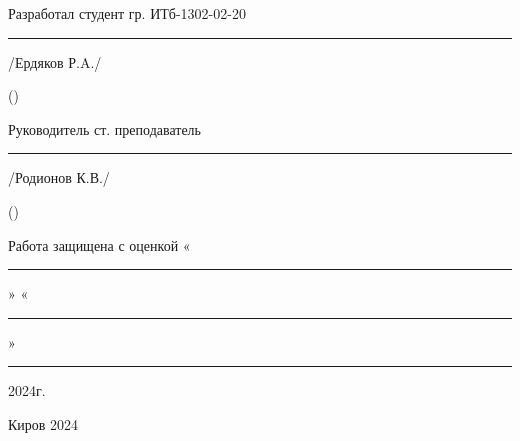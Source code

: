 \documentclass[a4paper, 10pt]{article}
\begin{document}
\begin{flushleft}
  {\large
    Разработал студент гр. ИТб-1302-02-20 \hfill \rule[0px]{60px}{0.5px}/Ердяков Р.A.\hspace{5px}/
    \vspace{10px}

    \hspace*{0.73\textwidth}({})\\
    \vspace{10px}

    Руководитель ст. преподаватель \hfill \rule[0px]{60px}{0.5px}/Родионов К.В./
    \vspace{10px}

    \hspace*{0.73\textwidth}({})\\
    \vspace{10px}

    Работа защищена с оценкой \hfill «\rule[0px]{55px}{0.5px}» «\rule[0px]{25px}{0.5px}»\rule[0px]{55px}{0.5px} 2024г.
  }
\end{flushleft}
\vspace{10\baselineskip}
\begin{center}
  {\large Киров 2024}
\end{center}

\newpage
\end{document}
